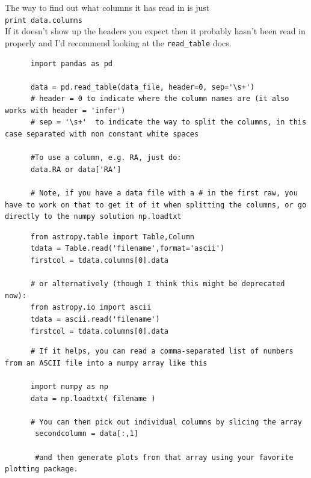 \documentclass[11pt,a4paper]{article}
\begin{document}
    \smallskip
    \smallskip
    \noindent
    The way to find out what columns it has read in is just\\
    {\tt print data.columns}\\

    \noindent
    If it doesn't show up the headers you expect then it probably
    hasn't been read in properly and I'd recommend looking at the
    {\tt read\_table} docs. 
    

    \begin{lstlisting}
      import pandas as pd
      
      data = pd.read_table(data_file, header=0, sep='\s+')
      # header = 0 to indicate where the column names are (it also works with header = 'infer')
      # sep = '\s+'  to indicate the way to split the columns, in this case separated with non constant white spaces

      #To use a column, e.g. RA, just do:
      data.RA or data['RA']

      # Note, if you have a data file with a # in the first raw, you have to work on that to get it of it when splitting the columns, or go directly to the numpy solution np.loadtxt 
    \end{lstlisting}
    \medskip     \medskip     \medskip


    \begin{lstlisting}
      from astropy.table import Table,Column
      tdata = Table.read('filename',format='ascii')
      firstcol = tdata.columns[0].data
      
      # or alternatively (though I think this might be deprecated now):
      from astropy.io import ascii
      tdata = ascii.read('filename')
      firstcol = tdata.columns[0].data
    \end{lstlisting}
    \medskip     \medskip     \medskip


    \begin{lstlisting}
      # If it helps, you can read a comma-separated list of numbers from an ASCII file into a numpy array like this

      import numpy as np
      data = np.loadtxt( filename )
      
      # You can then pick out individual columns by slicing the array
       secondcolumn = data[:,1]
       
       #and then generate plots from that array using your favorite plotting package.
      \end{lstlisting}
      \medskip     \medskip     \medskip
\end{document}
